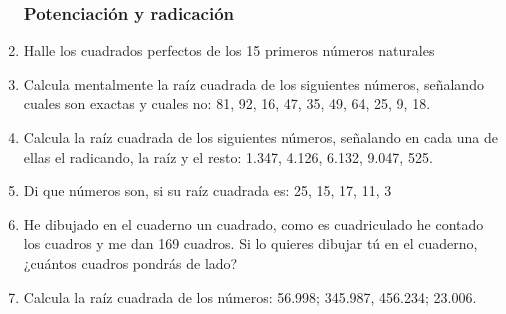 \documentclass[letterpaper,11pt,twoside]{article}
\begin{document}
\begin{enumerate}
\subsubsection*{Potenciación y radicación}
\item Halle los cuadrados perfectos de los 15 primeros números naturales
\item Calcula mentalmente la raíz cuadrada de los siguientes números, señalando cuales son exactas y cuales no: 81, 92, 16, 47, 35, 49, 64, 25, 9, 18.
\item Calcula la raíz cuadrada de los siguientes números, señalando en cada una de ellas el radicando, la raíz y el resto: 1.347, 4.126, 6.132, 9.047, 525.
\item Di que números son, si su raíz cuadrada es: 25, 15, 17, 11, 3
\item He dibujado en el cuaderno un cuadrado, como es cuadriculado he contado los cuadros y me dan 169 cuadros. Si lo quieres dibujar tú en el cuaderno, ¿cuántos cuadros pondrás de lado?
\item Calcula la raíz cuadrada de los números: 56.998; 345.987, 456.234; 23.006.

\end{enumerate}
\end{document}
